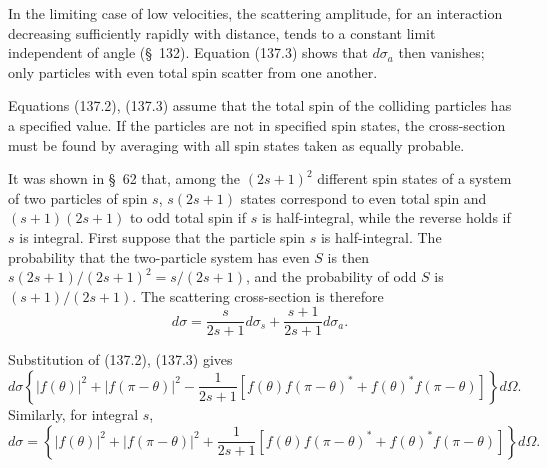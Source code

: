 In the limiting case of low velocities, the scattering amplitude, for an
interaction decreasing sufficiently rapidly with distance, tends to a
constant limit independent of angle (\S~132). Equation (137.3) shows that
$d\sigma_a$ then vanishes; only particles with even total spin scatter from
one another.

Equations (137.2), (137.3) assume that the total spin of the colliding
particles has a specified value. If the particles are not in specified spin
states, the cross-section must be found by averaging with all spin states
taken as equally probable.

It was shown in \S~62 that, among the $(2s+1)^2$ different spin states of a
system of two particles of spin $s$, $s(2s+1)$ states correspond to even total
spin and $(s+1)(2s+1)$ to odd total spin if $s$ is half-integral, while the
reverse holds if $s$ is integral. First suppose that the particle spin $s$ is
half-integral. The probability that the two-particle system has even $S$ is
then $s(2s+1)/(2s+1)^2=s/(2s+1)$, and the probability of odd $S$ is
$(s+1)/(2s+1)$. The scattering cross-section is therefore
\begin{equation}
 d\sigma=\frac{s}{2s+1}d\sigma_s+\frac{s+1}{2s+1}d\sigma_a.
 \tag{137.4}
\end{equation}

Substitution of (137.2), (137.3) gives
\begin{equation}
 d\sigma\left\{|f(\theta)|^2+|f(\pi-\theta)|^2
 -\frac1{2s+1}[f(\theta)f(\pi-\theta)^*+f(\theta)^*f(\pi-\theta)]\right\}d\Omega.
 \tag{137.5}
\end{equation}
Similarly, for integral $s$,
\begin{equation}
 d\sigma=\left\{|f(\theta)|^2+|f(\pi-\theta)|^2
 +\frac1{2s+1}[f(\theta)f(\pi-\theta)^*+f(\theta)^*f(\pi-\theta)]\right\}d\Omega.
 \tag{137.6}
\end{equation}

